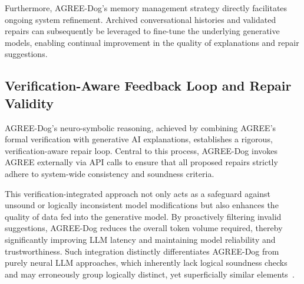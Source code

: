Furthermore, AGREE-Dog’s memory management strategy directly facilitates ongoing system refinement. Archived conversational histories and validated repairs can subsequently be leveraged to fine-tune the underlying generative models, enabling continual improvement in the quality of explanations and repair suggestions.


%


%

\subsection{Verification-Aware Feedback Loop and Repair Validity}

AGREE-Dog’s neuro-symbolic reasoning, achieved by combining AGREE's formal verification with generative AI explanations, establishes a rigorous, verification-aware repair loop. Central to this process, AGREE-Dog invokes AGREE externally via API calls to ensure that all proposed repairs strictly adhere to system-wide consistency and soundness criteria.

This verification-integrated approach not only acts as a safeguard against unsound or logically inconsistent model modifications but also enhances the quality of data fed into the generative model. By proactively filtering invalid suggestions, AGREE-Dog reduces the overall token volume required, thereby significantly improving LLM latency and maintaining model reliability and trustworthiness. Such integration distinctly differentiates AGREE-Dog from purely neural LLM approaches, which inherently lack logical soundness checks and may erroneously group logically distinct, yet superficially similar elements~\cite{CoqDog,CoqDogHCSS24,mirzadeh2025gsmsymbolic}.

